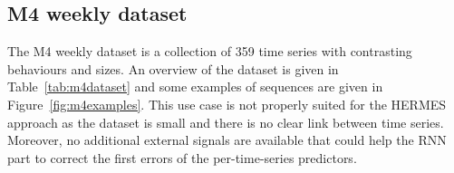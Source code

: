 \documentclass[10pt]{article} %
\begin{document}
\subsection{M4 weekly dataset}
\label{sec:m4overview}
The M4 weekly dataset is a collection of 359 time series with  contrasting behaviours and sizes. An overview of the dataset is given in Table~\ref{tab:m4dataset} and some examples of sequences are given in Figure~\ref{fig:m4examples}. This use case is not properly suited for the HERMES approach as the dataset is small and there is no clear link between time series. Moreover, no additional external signals are available that could help the RNN part to correct the first errors of the per-time-series predictors.

\begin{table}

  \caption{M4 weekly dataset overview. For each category, the number of sequences and the average length are given.}
\label{tab:m4dataset}
  \centering
\end{table}
\end{document}
